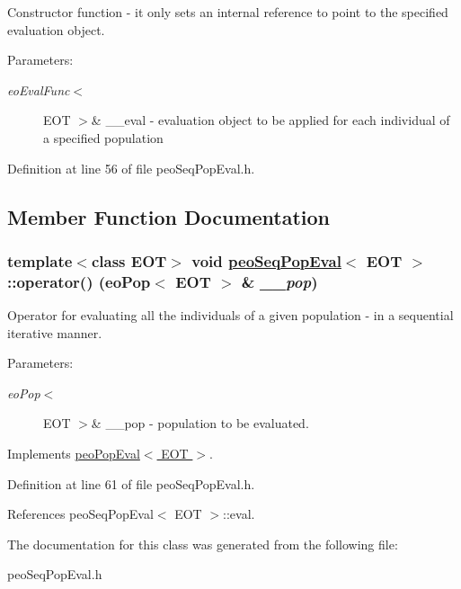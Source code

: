 Constructor function - it only sets an internal reference to point to the specified evaluation object. 

\begin{Desc}
\item[Parameters:]
\begin{description}
\item[{\em eo\-Eval\-Func$<$}]EOT $>$\& \_\-\_\-eval - evaluation object to be applied for each individual of a specified population \end{description}
\end{Desc}


Definition at line 56 of file peo\-Seq\-Pop\-Eval.h.

\subsection{Member Function Documentation}
\hypertarget{classpeoSeqPopEval_b2c88b9a3ad9091949acf741844eb02f}{
\subsubsection[operator()]{\setlength{\rightskip}{0pt plus 5cm}template$<$class EOT$>$ void \hyperlink{classpeoSeqPopEval}{peo\-Seq\-Pop\-Eval}$<$ EOT $>$::operator() (eo\-Pop$<$ EOT $>$ \& {\em \_\-\_\-pop})}}
\label{classpeoSeqPopEval_b2c88b9a3ad9091949acf741844eb02f}


Operator for evaluating all the individuals of a given population - in a sequential iterative manner. 

\begin{Desc}
\item[Parameters:]
\begin{description}
\item[{\em eo\-Pop$<$}]EOT $>$\& \_\-\_\-pop - population to be evaluated. \end{description}
\end{Desc}


Implements \hyperlink{classpeoPopEval_2f208067a5e39c3b26c1234050a41e8f}{peo\-Pop\-Eval$<$ EOT $>$}.

Definition at line 61 of file peo\-Seq\-Pop\-Eval.h.

References peo\-Seq\-Pop\-Eval$<$ EOT $>$::eval.

The documentation for this class was generated from the following file:\begin{CompactItemize}
\item 
peo\-Seq\-Pop\-Eval.h\end{CompactItemize}
